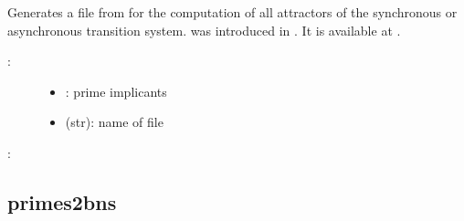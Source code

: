 \documentclass[letterpaper,10pt,english]{sphinxmanual}
\begin{document}
\begin{fulllineitems}
\label{\detokenize{FileExchange:PyBoolNet.FileExchange.primes2genysis}}
Generates a  file from  for the computation of all attractors of the synchronous or asynchronous transition system.
 was introduced in {\hyperref[\detokenize{Bibliography:garg2008}]{}}.
It is available at .
\begin{description}
\item[{:}] \leavevmode\begin{itemize}
\item {} 
: prime implicants

\item {} 
 (str): name of  file

\end{itemize}

\end{description}

:

\begin{sphinxVerbatim}[commandchars=\\\{\}]
 
\end{sphinxVerbatim}

\end{fulllineitems}



\subsection{primes2bns}
\label{\detokenize{FileExchange:id7}}\label{\detokenize{FileExchange:primes2bns}}
\end{document}
